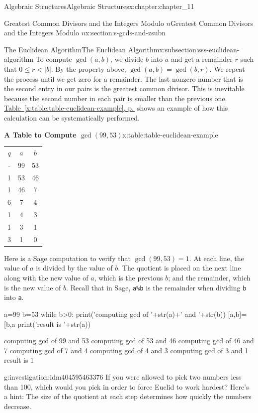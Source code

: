 \documentclass[twoside,10pt,]{book}
\newcommand{\tabularfont}{\relax}
\newcommand{\xreffont}{\relax}
\newcommand{\mono}[1]{\texttt{#1}}
\numberwithin{equation}{section}
\begin{document}
\begin{chapterptx}{Algebraic Structures}{}{Algebraic Structures}{}{}{x:chapter:chapter_11}
\begin{sectionptx}{Greatest Common Divisors  and the Integers Modulo \(n\)}{}{Greatest Common Divisors  and the Integers Modulo \(n\)}{}{}{x:section:s-gcds-and-zsubn}
\begin{subsectionptx}{The Euclidean Algorithm}{}{The Euclidean Algorithm}{}{}{x:subsection:sss-euclidean-algorithm}
To compute \(\gcd(a,b)\), we divide \(b\) into \(a\) and get a remainder \(r\) such that \(0\leq  r <\lvert b\rvert \).  By the property above, \(\gcd(a, b)= \gcd(b, r)\).  We repeat the process until  we get zero for a remainder.  The last nonzero number that is the second entry in our pairs is the greatest common divisor.   This is inevitable because the second number in each pair is smaller than the previous one.  \hyperref[x:table:table-euclidean-example]{Table~{\xreffont\ref{x:table:table-euclidean-example}}, p.\,\pageref{x:table:table-euclidean-example}} shows an example of how this calculation can be systematically performed.%
\begin{tableptx}{\textbf{A Table to Compute \(\gcd(99,53)\)}}{x:table:table-euclidean-example}{}%
\centering
{\tabularfont%
\begin{tabular}{ccc}
\(q\)&\(a\)&\(b\)\tabularnewline[0pt]
-&99&53\tabularnewline[0pt]
1&53&46\tabularnewline[0pt]
1&46&7\tabularnewline[0pt]
6&7&4\tabularnewline[0pt]
1&4&3\tabularnewline[0pt]
1&3&1\tabularnewline[0pt]
3&1&0
\end{tabular}
}%
\end{tableptx}%
Here is a Sage computation to verify that \(\gcd(99, 53) = 1\).   At each line, the value of \(a\) is divided by the value of \(b\).   The quotient is placed on the next line along with the new value of \(a\), which is the previous \(b\); and the remainder, which is the new value of \(b\).  Recall that in Sage, \mono{a\%b} is the remainder when dividing \mono{b} into \mono{a}.%
\begin{sageinput}
a=99
b=53
while b>0:
    print('computing gcd of '+str(a)+' and '+str(b))
    [a,b]=[b,a%
print('result is '+str(a))
\end{sageinput}
\begin{sageoutput}
computing gcd of 99 and 53
computing gcd of 53 and 46
computing gcd of 46 and 7
computing gcd of 7 and 4
computing gcd of 4 and 3
computing gcd of 3 and 1
result is 1
\end{sageoutput}
\begin{investigation}{}{g:investigation:idm404595463376}%
If you were allowed to pick two numbers less than 100, which would you pick in order to force Euclid to work hardest? Here's a hint:  The size of the quotient at each step determines how quickly the numbers decrease.%
\par\smallskip%

\end{investigation}
\end{subsectionptx}
\end{sectionptx}
\end{chapterptx}
\end{document}
